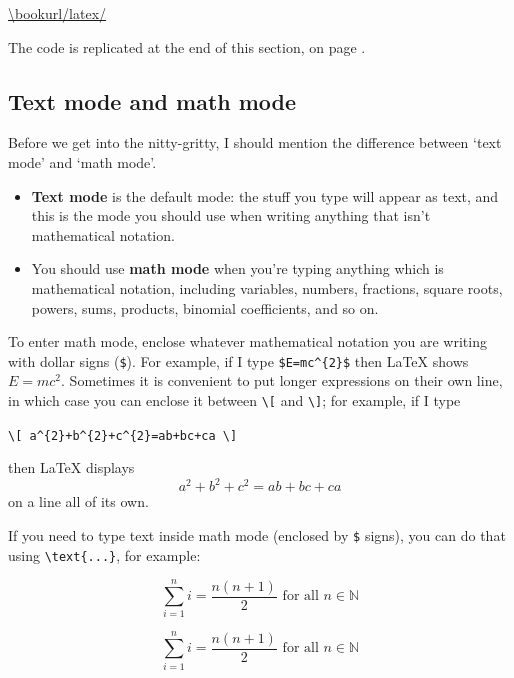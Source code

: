 \vspace{-15pt}
\begin{center}
\url{\bookurl/latex/}
\end{center}

\vspace{-15pt}
The code is replicated at the end of this section, on page \pageref{pTeXTemplate}.

\newpage
\subsection*{Text mode and math mode}
Before we get into the nitty-gritty, I should mention the difference between `text mode' and `math mode'.

\begin{itemize}
\item \textbf{Text mode} is the default mode: the stuff you type will appear as text, and this is the mode you should use when writing anything that isn't mathematical notation.
\item You should use \textbf{math mode} when you're typing anything which is mathematical notation, including variables, numbers, fractions, square roots, powers, sums, products, binomial coefficients, and so on.
\end{itemize}

To enter math mode, enclose whatever mathematical notation you are writing with dollar signs (\texttt{\${}}). For example, if I type \lstinline|$E=mc^{2}$| then \LaTeX{} shows $E=mc^2$. Sometimes it is convenient to put longer expressions on their own line, in which case you can enclose it between \lstinline|\[| and \lstinline|\]|; for example, if I type
\begin{center}\lstinline|\[ a^{2}+b^{2}+c^{2}=ab+bc+ca \]|\end{center}
then \LaTeX{} displays \[ a^{2}+b^{2}+c^{2}=ab+bc+ca \] on a line all of its own.

If you need to type text inside math mode (enclosed by \texttt{\$} signs), you can do that using \lstinline|\text{...}|, for example:

\begin{texcodeleft}[1]
\[ \sum_{i=1}^n i = \frac{n(n+1)}{2} \text{ for all } n \in \mathbb{N} \]
\end{texcodeleft}

\begin{texcoderight}[1]
\[ \sum_{i=1}^n i = \frac{n(n+1)}{2} \text{ for all } n \in \mathbb{N} \]
\end{texcoderight}

